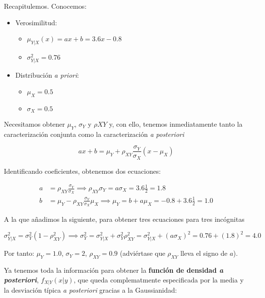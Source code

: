 \documentclass[11pt]{article}
\providecommand{\tightlist}{%
      \setlength{\itemsep}{0pt}\setlength{\parskip}{0pt}}
\begin{document}
    Recapitulemos. Conocemos:

\begin{itemize}
\tightlist
\item
  Verosimilitud:

  \begin{itemize}
  \tightlist
  \item
    \(\mu_{Y | X}(x) = ax + b = 3.6x - 0.8\)
  \item
    \(\sigma_{Y | X}^2 = 0.76\)
  \end{itemize}
\item
  Distribución \emph{a priori}:

  \begin{itemize}
  \tightlist
  \item
    \(\mu_X = 0.5\)
  \item
    \(\sigma_X = 0.5\)
  \end{itemize}
\end{itemize}

Necesitamos obtener \(\mu_Y\), \(\sigma_Y\) y \(\rho{XY}\) y, con ello,
tenemos inmediatamente tanto la caracterización conjunta como la
caracterización \emph{a posteriori}

    \[
ax+b = \mu_{Y}+\rho_{XY} \frac{\sigma_{Y}}{\sigma_{X}}\left(x-\mu_{X}\right)
\]

Identificando coeficientes, obtenemos dos ecuaciones:

\begin{align}
a &= \rho_{XY} \frac{\sigma_{Y}}{\sigma_{X}} \implies \rho_{XY}\sigma_{Y} = a\sigma_{X} = 3.6\frac{1}{2}=1.8\\
b &= \mu_{Y}-\rho_{XY} \frac{\sigma_{Y}}{\sigma_{X}}\mu_{X} \implies \mu_{Y} = b + a\mu_X = -0.8 + 3.6\frac{1}{2}=1.0
\end{align}

A la que añadimos la siguiente, para obtener tres ecuaciones para tres
incógnitas

\[
\sigma_{Y | X}^2 = \sigma_{Y}^2 (1-\rho_{XY}^{2}) \implies \sigma_{Y}^2 = \sigma_{Y | X}^2 + \sigma_{Y}^2 \rho_{XY}^{2} = \sigma_{Y | X}^2 + (a\sigma_{X})^2 = 0.76 + (1.8)^2 = 4.0
\]

Por tanto: \(\mu_Y = 1.0\), \(\sigma_Y = 2\), \(\rho_{XY}=0.9\)
(adviértase que \(\rho_{XY}\) lleva el signo de \(a\)).

    Ya tenemos toda la información para obtener la \textbf{función de
densidad \emph{a posteriori}}, \(f_{X | Y}(x | y)\), que queda
complematmente especificada por la media y la desviación típica \emph{a
posteriori} gracias a la Gaussianidad:
\end{document}
